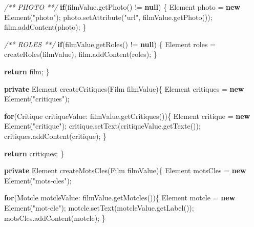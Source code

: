 \documentclass[]{article}
\newenvironment{Shaded}{}{}
\newcommand{\KeywordTok}[1]{\textcolor[rgb]{0.00,0.44,0.13}{\textbf{{#1}}}}
\newcommand{\StringTok}[1]{\textcolor[rgb]{0.25,0.44,0.63}{{#1}}}
\newcommand{\CommentTok}[1]{\textcolor[rgb]{0.38,0.63,0.69}{\textit{{#1}}}}
\newcommand{\FunctionTok}[1]{\textcolor[rgb]{0.02,0.16,0.49}{{#1}}}
\newcommand{\BuiltInTok}[1]{{#1}}
\newcommand{\NormalTok}[1]{{#1}}
\begin{document}
\begin{Shaded}
\begin{Highlighting}[]
		\CommentTok{/** PHOTO **/}
		\KeywordTok{if}\NormalTok{(filmValue.}\FunctionTok{getPhoto}\NormalTok{() != }\KeywordTok{null}\NormalTok{) \{}
			\BuiltInTok{Element} \NormalTok{photo = }\KeywordTok{new} \BuiltInTok{Element}\NormalTok{(}\StringTok{"photo"}\NormalTok{);}
			\NormalTok{photo.}\FunctionTok{setAttribute}\NormalTok{(}\StringTok{"url"}\NormalTok{, filmValue.}\FunctionTok{getPhoto}\NormalTok{());}
			\NormalTok{film.}\FunctionTok{addContent}\NormalTok{(photo);}
		\NormalTok{\}}

		\CommentTok{/** ROLES **/}
		\KeywordTok{if}\NormalTok{(filmValue.}\FunctionTok{getRoles}\NormalTok{() != }\KeywordTok{null}\NormalTok{) \{}
			\BuiltInTok{Element} \NormalTok{roles = }\FunctionTok{createRoles}\NormalTok{(filmValue);}
			\NormalTok{film.}\FunctionTok{addContent}\NormalTok{(roles);}
		\NormalTok{\}}

		\KeywordTok{return} \NormalTok{film;}
	\NormalTok{\}}

	\KeywordTok{private} \BuiltInTok{Element} \FunctionTok{createCritiques}\NormalTok{(Film filmValue)\{}
		\BuiltInTok{Element} \NormalTok{critiques = }\KeywordTok{new} \BuiltInTok{Element}\NormalTok{(}\StringTok{"critiques"}\NormalTok{);}

		\KeywordTok{for}\NormalTok{(Critique critiqueValue: filmValue.}\FunctionTok{getCritiques}\NormalTok{())\{}
			\BuiltInTok{Element} \NormalTok{critique = }\KeywordTok{new} \BuiltInTok{Element}\NormalTok{(}\StringTok{"critique"}\NormalTok{);}
			\NormalTok{critique.}\FunctionTok{setText}\NormalTok{(critiqueValue.}\FunctionTok{getTexte}\NormalTok{());}
			\NormalTok{critiques.}\FunctionTok{addContent}\NormalTok{(critique);}
		\NormalTok{\}}

		\KeywordTok{return} \NormalTok{critiques;}
	\NormalTok{\}}

	\KeywordTok{private} \BuiltInTok{Element} \FunctionTok{createMotsCles}\NormalTok{(Film filmValue)\{}
		\BuiltInTok{Element} \NormalTok{motsCles = }\KeywordTok{new} \BuiltInTok{Element}\NormalTok{(}\StringTok{"mots-cles"}\NormalTok{);}

		\KeywordTok{for}\NormalTok{(Motcle motcleValue: filmValue.}\FunctionTok{getMotcles}\NormalTok{())\{}
			\BuiltInTok{Element} \NormalTok{motcle = }\KeywordTok{new} \BuiltInTok{Element}\NormalTok{(}\StringTok{"mot-cle"}\NormalTok{);}
			\NormalTok{motcle.}\FunctionTok{setText}\NormalTok{(motcleValue.}\FunctionTok{getLabel}\NormalTok{());}
			\NormalTok{motsCles.}\FunctionTok{addContent}\NormalTok{(motcle);}
		\NormalTok{\}}


\end{Highlighting}
\end{Shaded}
\end{document}
